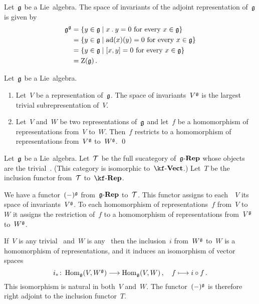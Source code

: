 

\begin{example}
  Let~$\glie$ be a Lie~algebra.
  The space of invariants of the adjoint representation of~$\glie$ is given by
  \begin{align*}
    \glie^{\glie}
    &=
    \{
      y \in \glie
    \suchthat
      \text{$x \act y = 0$ for every~$x \in \glie$}
    \}
    \\
    &=
    \{
      y \in \glie
    \suchthat
      \text{$\ad(x)(y) = 0$ for every~$x \in \glie$}
    \}
    \\
    &=
    \{
      y \in \glie
    \suchthat
      \text{$[x,y] = 0$ for every~$x \in \glie$}
    \}
    \\
    &=
    \centerlie(\glie) \,.
  \end{align*}
\end{example}


\begin{proposition}
  Let~$\glie$ be a Lie~algebra.
  \begin{enumerate}
    \item
      Let~$V$ be a representation of~$\glie$.
      The space of invariants~$V^{\mathfrak{g}}$ is the largest trivial subrepresentation of~$V$.
    \item
      Let~$V$ and~$W$ be two representations of~$\glie$ and let~$f$ be a homomorphism of representations from~$V$ to~$W$.
      Then~$f$ restricts to a homomorphism of representations from~$V^{\mathfrak{g}}$ to~$W^{\mathfrak{g}}$.
    \qed
  \end{enumerate}
\end{proposition}


\begin{remark}
  \label{invariants are right adjoint}
  Let~$\glie$ be a Lie~algebra.
  Let~$\mathcal{T}$ be the full sucategory of~$\mathfrak{g}\text{-}\mathbf{Rep}$ whose objects are the trivial~\representations{$\glie$}.
  (This category is isomorphic to~$\cVect{\kf}$.)
  Let~$T$ be the inclusion functor from~$\mathcal{T}$ to~$\cRep{\kf}$.

  We have a functor~$(-)^{\mathfrak{g}}$ from~$\mathfrak{g}\text{-}\mathbf{Rep}$ to~$\mathcal{T}$.
  This functor assigns to each~\representation{$\glie$}~$V$ its space of invariants~$V^{\mathfrak{g}}$.
  To each homomorphism of representations~$f$ from~$V$ to~$W$ it assigns the restriction of~$f$ to a homomorphism of representations from~$V^{\mathfrak{g}}$ to~$W^{\mathfrak{g}}$.

  If~$V$ is any trivial~\representation{$\glie$} and~$W$ is any~\representation{$\glie$} then the inclusion~$i$ from~$W^{\mathfrak{g}}$ to~$W$ is a homomorphism of representations, and it induces an isomorphism of vector spaces
  \[
    i_*
    \colon
    \Hom_{\glie}(V, W^{\glie})
    \to
    \Hom_{\glie}(V, W) \,,
    \quad
    f
    \mapsto
    i \circ f \,.
  \]
  This isomorphism is natural in both~$V$ and~$W$.
  The functor~$(-)^{\mathfrak{g}}$ is therefore right adjoint to the inclusion functor~$T$.
\end{remark}


